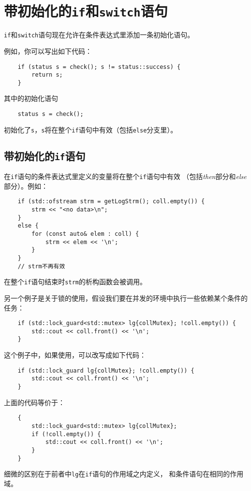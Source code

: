 \chapter{带初始化的\texttt{if}和\texttt{switch}语句}\label{ch2}
\texttt{if}和\texttt{switch}语句现在允许在条件表达式里添加一条初始化语句。

例如，你可以写出如下代码：
\begin{lstlisting}
    if (status s = check(); s != status::success) {
        return s;
    }
\end{lstlisting}
其中的初始化语句
\begin{lstlisting}
    status s = check();
\end{lstlisting}
初始化了\texttt{s}，\texttt{s}将在整个\texttt{if}语句中有效（包括\texttt{else}分支里）。

\section{带初始化的\texttt{if}语句}\label{ch2.1}
在\texttt{if}语句的条件表达式里定义的变量将在整个\texttt{if}语句中有效
（包括\emph{then}部分和\emph{else}部分）。例如：
\begin{lstlisting}
    if (std::ofstream strm = getLogStrm(); coll.empty()) {
        strm << "<no data>\n";
    }
    else {
        for (const auto& elem : coll) {
            strm << elem << '\n';
        }
    }
    // strm不再有效
\end{lstlisting}
在整个\texttt{if}语句结束时\texttt{strm}的析构函数会被调用。

另一个例子是关于锁的使用，假设我们要在并发的环境中执行一些依赖某个条件的任务：
\begin{lstlisting}
    if (std::lock_guard<std::mutex> lg{collMutex}; !coll.empty()) {
        std::cout << coll.front() << '\n';
    }
\end{lstlisting}
这个例子中，如果使用，可以改写成如下代码：
\begin{lstlisting}
    if (std::lock_guard lg{collMutex}; !coll.empty()) {
        std::cout << coll.front() << '\n';
    }
\end{lstlisting}
上面的代码等价于：
\begin{lstlisting}
    {
        std::lock_guard<std::mutex> lg{collMutex};
        if (!coll.empty()) {
            std::cout << coll.front() << '\n';
        }
    }
\end{lstlisting}
细微的区别在于前者中\texttt{lg}在\texttt{if}语句的作用域之内定义，
和条件语句在相同的作用域。


